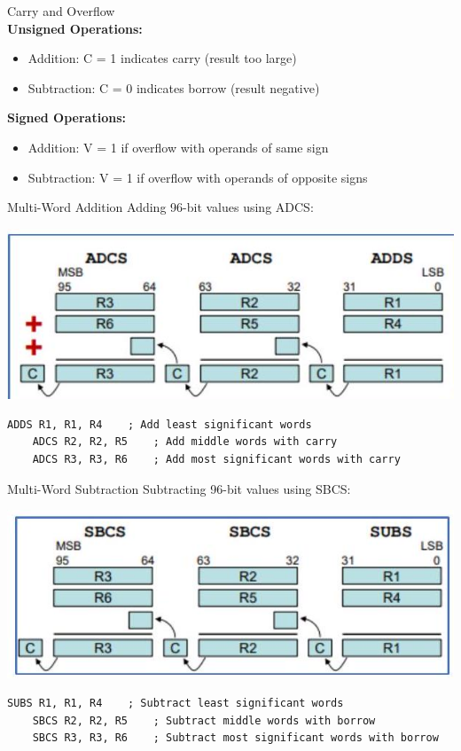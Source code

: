 \begin{concept}{Carry and Overflow}\\
\textbf{Unsigned Operations:}
\begin{itemize}
  \item Addition: C = 1 indicates carry (result too large)
  \item Subtraction: C = 0 indicates borrow (result negative)
\end{itemize}

\textbf{Signed Operations:}
\begin{itemize}
  \item Addition: V = 1 if overflow with operands of same sign
  \item Subtraction: V = 1 if overflow with operands of opposite signs
\end{itemize}
\end{concept}

\begin{example2}{Multi-Word Addition}
Adding 96-bit values using ADCS:

\includegraphics[width=\linewidth]{images/2024_12_29_79e6b22f503fb7b4f718g-04}

\begin{lstlisting}[language=armasm, style=basesmol]
    ADDS R1, R1, R4    ; Add least significant words
    ADCS R2, R2, R5    ; Add middle words with carry
    ADCS R3, R3, R6    ; Add most significant words with carry
\end{lstlisting}
\end{example2}

\begin{example2}{Multi-Word Subtraction}
Subtracting 96-bit values using SBCS:

\includegraphics[width=\linewidth]{images/2024_12_29_79e6b22f503fb7b4f718g-04(1)}

\begin{lstlisting}[language=armasm, style=basesmol]
    SUBS R1, R1, R4    ; Subtract least significant words
    SBCS R2, R2, R5    ; Subtract middle words with borrow
    SBCS R3, R3, R6    ; Subtract most significant words with borrow
\end{lstlisting}
\end{example2}

